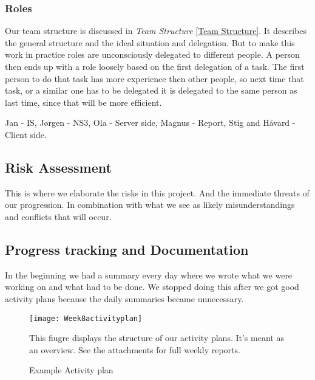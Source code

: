     \subsubsection{Roles}\label{roles}
    Our team structure is discussed in \textit{Team Structure} \ref{Team Structure}. It describes the general structure and the ideal situation and delegation. 
    But to make this work in practice roles are unconsciously delegated to different people. A person then ends up with a role loosely based on the first delegation of a task. The first person to do that task has more experience then other people, so next time that task, or a similar one has to be delegated it is delegated to the same person as last time, since that will be more efficient. 
        
     Jan - IS, Jørgen - NS3, Ola - Server side, Magnus - Report, Stig and Håvard - Client side.
         
    \subsection{Risk Assessment}\label{Risk Assessment}
    This is where we elaborate the risks in this project. And the immediate threats of our progression. In combination with what we see as likely misunderstandings and conflicts that will occur. 

    \subsection{Progress tracking and Documentation}\label{Progress tracking and Documentation}
    In the beginning we had a summary every day where we wrote what we were working on and what had to be done. We stopped doing this after we got good activity plans because the daily summaries became unnecessary. 
    
    \begin{figure}[h]
        \centering
        \texttt{[image: Week8activityplan]}
        \caption{Example Activity plan}
        This fiugre displays the structure of our activity plans. It's meant as an overview. See the attachments for full weekly reports. 
        \label{fig:Week8activityplan}
    \end{figure}
    
